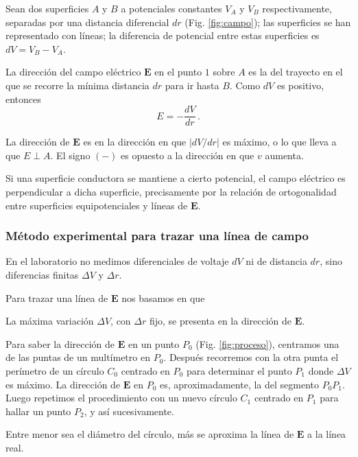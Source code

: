 Sean dos superficies $A$ y $B$ a potenciales constantes $V_A$ y $V_B$ respectivamente, separadas por una distancia diferencial $dr$ (Fig. \ref{fig:campo}); las superficies se han representado con líneas; la diferencia de potencial entre estas superficies es $dV = V_B - V_A$.

La dirección del campo eléctrico $\boldsymbol{E}$ en el punto $1$ sobre $A$ es la del trayecto en el que se recorre la mínima distancia $dr$ para ir hasta $B$. Como $dV$ es positivo, entonces \begin{equation}\label{eq:gradient}
    E = -\frac{dV}{dr}\,.
\end{equation}

La dirección de $\boldsymbol{E}$ es en la dirección en que $|dV/dr|$ es máximo, o lo que lleva a que $E \perp A$. El signo $(-)$ es opuesto a la dirección en que $v$ aumenta.

Si una superficie conductora se mantiene a cierto potencial, el campo eléctrico es perpendicular a dicha superficie, precisamente por la relación de ortogonalidad entre superficies equipotenciales y líneas de $\boldsymbol{E}$.

\subsubsection{Método experimental para trazar una línea de campo}
\label{sssec:metodo}

En el laboratorio no medimos diferenciales de voltaje $dV$ ni de distancia $dr$, sino diferencias finitas $\Delta V$ y $\Delta r$.

Para trazar una línea de $\boldsymbol{E}$ nos basamos en que

\begin{center}
La máxima variación $\Delta V$, con $\Delta r$ fijo, se presenta en la dirección de $\boldsymbol{E}$.
\end{center}



Para saber la dirección de $\boldsymbol{E}$ en un punto $P_0$ (Fig. \ref{fig:proceso}), centramos una de las puntas de un multímetro en $P_0$. Después recorremos con la otra punta el perímetro de un círculo $C_0$ centrado en $P_0$ para determinar el punto $P_1$ donde $\Delta V$ es máximo. La dirección de $\boldsymbol{E}$ en $P_0$ es, aproximadamente, la del segmento $P_0P_1$. Luego repetimos el procedimiento con un nuevo círculo $C_1$ centrado en $P_1$ para hallar un punto $P_2$, y así sucesivamente.


\begin{center}
Entre menor sea el diámetro del círculo, más se aproxima la línea de $\boldsymbol{E}$ a la línea real.
\end{center}

